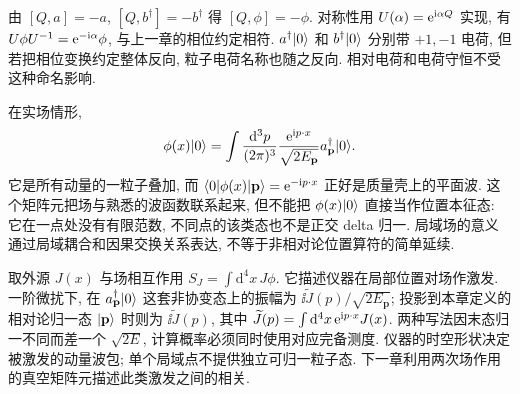由 $[Q,a]=-a$, $[Q,b^\dagger]=-b^\dagger$ 得 $[Q,\phi]=-\phi$. 对称性用 $U(\alpha)=\mathrm e^{\mathrm i\alpha Q}$ 实现, 有 $U\phi U^{-1}=\mathrm e^{-\mathrm i\alpha}\phi$, 与上一章的相位约定相符. $a^\dagger\lvert 0\rangle$ 和 $b^\dagger\lvert 0\rangle$ 分别带 $+1,-1$ 电荷, 但若把相位变换约定整体反向, 粒子电荷名称也随之反向. 相对电荷和电荷守恒不受这种命名影响.

在实场情形,
\[
\phi(x)\lvert 0\rangle=\int\frac{\mathrm d^3p}{(2\pi)^3}\frac{\mathrm e^{\mathrm i p\cdot x}}{\sqrt{2E_{\mathbf p}}}a^\dagger_{\mathbf p}\lvert 0\rangle.
\]
它是所有动量的一粒子叠加, 而 $\langle 0\rvert\phi(x)\lvert \mathbf p\rangle=\mathrm e^{-\mathrm i p\cdot x}$ 正好是质量壳上的平面波. 这个矩阵元把场与熟悉的波函数联系起来, 但不能把 $\phi(x)\lvert 0\rangle$ 直接当作位置本征态: 它在一点处没有有限范数, 不同点的该类态也不是正交 delta 归一. 局域场的意义通过局域耦合和因果交换关系表达, 不等于非相对论位置算符的简单延续.

取外源 $J(x)$ 与场相互作用 $S_J=\int\mathrm d^4x\,J\phi$. 它描述仪器在局部位置对场作激发. 一阶微扰下, 在 $a^\dagger_{\mathbf p}\lvert 0\rangle$ 这套非协变态上的振幅为 $\ii\widetilde J(p)/\sqrt{2E_{\mathbf p}}$; 投影到本章定义的相对论归一态 $\lvert \mathbf p\rangle$ 时则为 $\ii\widetilde J(p)$, 其中 $\widetilde J(p)=\int\mathrm d^4x\,\mathrm e^{\mathrm i p\cdot x}J(x)$. 两种写法因末态归一不同而差一个 $\sqrt{2E}$, 计算概率必须同时使用对应完备测度. 仪器的时空形状决定被激发的动量波包; 单个局域点不提供独立可归一粒子态. 下一章利用两次场作用的真空矩阵元描述此类激发之间的相关.
